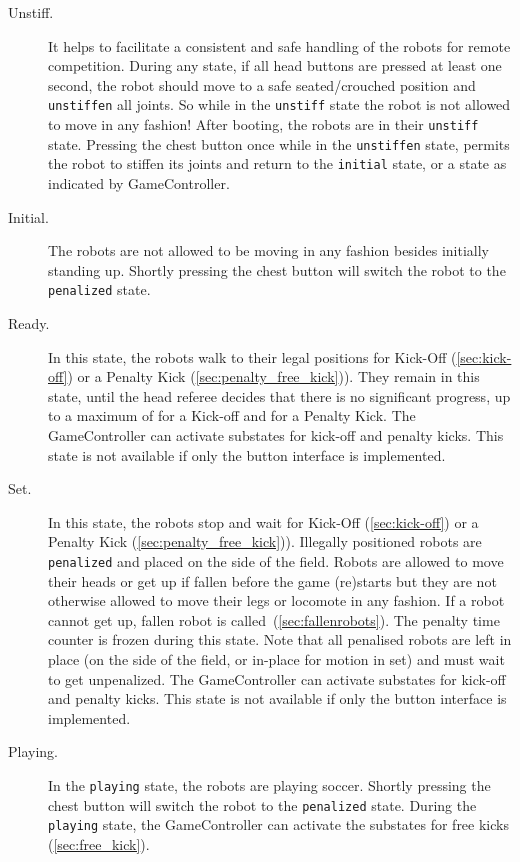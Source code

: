 \begin{description}
  \item [Unstiff.] It helps to facilitate a consistent and safe handling of the robots for remote competition. During any state, if all head buttons are pressed at least one second, the robot should move to a safe seated/crouched position and \texttt{unstiffen} all joints. So while in the \texttt{unstiff} state the robot is not allowed to move in any fashion! After booting, the robots are in their \texttt{unstiff} state. Pressing the chest button once while in the \texttt{unstiffen} state, permits the robot to stiffen its joints and return to the \texttt{initial} state, or a state as indicated by GameController.

  \item[Initial.] The robots are not allowed to be moving in any fashion besides initially standing up. Shortly pressing the chest button will switch the robot to the \texttt{penalized} state.

  \item[Ready.] In this state, the robots walk to their legal positions for Kick-Off  (\cf \cref{sec:kick-off}) or a Penalty Kick (\cf \cref{sec:penalty_free_kick})). They remain in this state, until the head referee decides that there is no significant progress, up to a maximum of \KickOffAutoTime for a Kick-off and \PenaltyFreeKickSetupTime for a Penalty Kick.
  The GameController can activate substates for kick-off and penalty kicks.
  This state is not available if only the button interface is implemented.

  \item[Set.] In this state, the robots stop and wait for Kick-Off  (\cf \cref{sec:kick-off}) or a Penalty Kick (\cf \cref{sec:penalty_free_kick})).
  Illegally positioned robots are \texttt{penalized} and placed on the side of the field.
  Robots are allowed to move their heads or get up if fallen before the game (re)starts but they are not otherwise allowed to move their legs or locomote in any fashion.
  If a robot cannot get up, fallen robot is called~(\cf \cref{sec:fallenrobots}).
  The penalty time counter is frozen during this state.
  Note that all penalised robots are left in place (on the side of the field, or in-place for motion in set) and must wait to get unpenalized.
  The GameController can activate substates for kick-off and penalty kicks.
  This state is not available if only the button interface is implemented.

  \item[Playing.] In the \texttt{playing} state, the robots are playing soccer. Shortly pressing the chest button will switch the robot to the \texttt{penalized} state. During the \texttt{playing} state, the GameController can activate the substates for free kicks (\cf \cref{sec:free_kick}).


\end{description}
